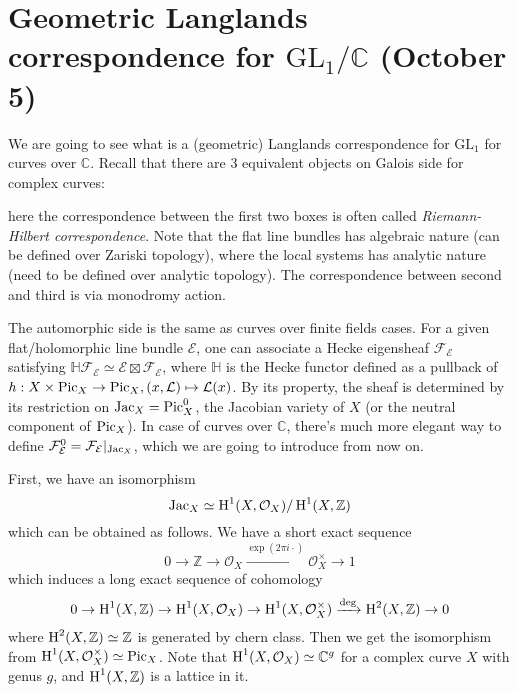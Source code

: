 \newpage
\section{Geometric Langlands correspondence for $\mathrm{GL}_{1}/\mathbb{C}$ (October 5)}

We are going to see what is a (geometric) Langlands correspondence for $\mathrm{GL}_1$ for
curves over $\mathbb{C}$.
Recall that there are 3 equivalent objects on Galois side for complex curves:

\begin{center}
\end{center}
here the correspondence between the first two boxes is often called \emph{Riemann-Hilbert correspondence}.
Note that the flat line bundles has algebraic nature (can be defined over Zariski topology), where
the local systems has analytic nature (need to be defined over analytic topology).
The correspondence between second and third is via monodromy action.

The automorphic side is the same as curves over finite fields cases.
For a given flat/holomorphic line bundle $\mathcal{E}$, one can associate a Hecke eigensheaf
$\mathcal{F}_{\mathcal{E}}$ satisfying $\mathbb{H}\mathcal{F}_{\mathcal{E}} \simeq \mathcal{E} \boxtimes \mathcal{F}_{\mathcal{E}}$,
where $\mathbb{H}$ is the Hecke functor defined as a pullback of $h: X \times \operatorname{\mathrm{Pic}}_X \to \operatorname{\mathrm{Pic}}_X, (x, \mathcal{L}) \mapsto \mathcal{L}(x)$.
By its property, the sheaf is determined by its restriction on $\operatorname{\mathrm{Jac}}_X = \operatorname{\mathrm{Pic}}_X^0$, the Jacobian variety of $X$
(or the neutral component of $\operatorname{\mathrm{Pic}}_X$).
In case of curves over $\mathbb{C}$, there's much more elegant way to define $\mathcal{F}_{\mathcal{E}}^{0} = \mathcal{F}_{\mathcal{E}} |_{\operatorname{\mathrm{Jac}}_X}$,
which we are going to introduce from now on.

First, we have an isomorphism
$$
\operatorname{\mathrm{Jac}}_X \simeq \operatorname{\mathrm{H}}^{1}(X, \mathcal{O}_X) / \operatorname{\mathrm{H}}^{1}(X, \mathbb{Z})
$$
which can be obtained as follows.
We have a short exact sequence
$$
0 \to \mathbb{Z} \to \mathcal{O}_X \xrightarrow{\exp(2\pi i\cdot)} \mathcal{O}_X^{\times} \to 1
$$
which induces a long exact sequence of cohomology
$$
0 \to \operatorname{\mathrm{H}}^{1}(X, \mathbb{Z}) \to \operatorname{\mathrm{H}}^1(X, \mathcal{O}_X) \to \operatorname{\mathrm{H}}^{1}(X, \mathcal{O}_X^{\times}) \xrightarrow{\mathrm{deg}} \operatorname{\mathrm{H}}^{2}(X, \mathbb{Z}) \to 0
$$
where $\operatorname{\mathrm{H}}^{2}(X, \mathbb{Z}) \simeq \mathbb{Z}$ is generated by chern class.
Then we get the isomorphism from $\operatorname{\mathrm{H}}^{1}(X, \mathcal{O}_X^{\times}) \simeq \operatorname{\mathrm{Pic}}_X$.
Note that $\operatorname{\mathrm{H}}^{1}(X, \mathcal{O}_X) \simeq \mathbb{C}^{g}$ for a complex curve $X$ with genus $g$,
and $\operatorname{\mathrm{H}}^{1}(X, \mathbb{Z})$ is a lattice in it.

